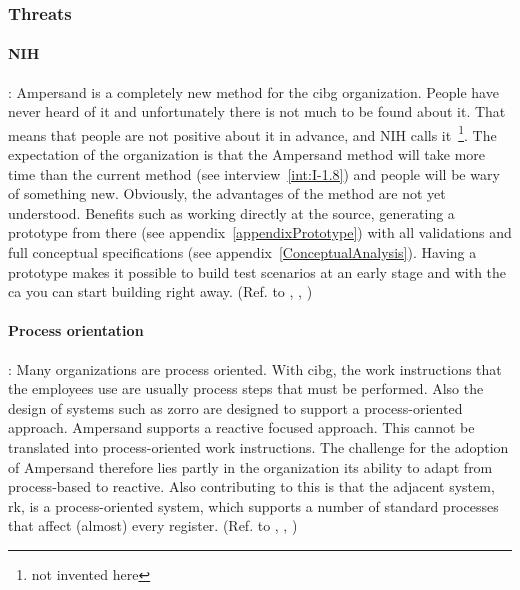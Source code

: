 \subsubsection{Threats}\label{subsub:4_treaths}

\paragraph{\textbf{NIH}}\label{swot:t_nih}:
Ampersand is a completely new method for the \acrshort{cibg} organization.
People have never heard of it and unfortunately there is not much to be found about it.
That means that people are not positive about it in advance, and NIH calls it~\footnote{not invented here}\citep{antons_assessing_2017}.
The expectation of the organization is that the Ampersand method will take more time than the current method (see interview~\ref{int:I-1.8}) and people will be wary of something new.
Obviously, the advantages of the method are not yet understood.
Benefits such as working directly at the source, generating a prototype from there (see appendix~\ref{appendixPrototype}) with all validations and full conceptual specifications (see appendix~\ref{ConceptualAnalysis}).
Having a prototype makes it possible to build test scenarios at an early stage and with the \acrlong{ca} you can start building right away.
(Ref. to , , )

\paragraph{\textbf{Process orientation}}\label{swot:t_process_orientation}:
Many organizations are process oriented.
With \acrshort{cibg}, the work instructions that the employees use are usually process steps that must be performed.
Also the design of systems such as \acrshort{zorro} are designed to support a process-oriented approach.
Ampersand supports a reactive focused approach.
This cannot be translated into process-oriented work instructions.
The challenge for the adoption of Ampersand therefore lies partly in the organization its ability to adapt from process-based to reactive.
Also contributing to this is that the adjacent system, \acrshort{rk}, is a process-oriented system, which supports a number of standard processes that affect (almost) every register.
(Ref. to , , )


